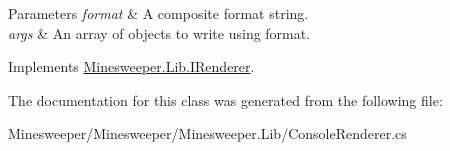 \begin{DoxyParams}{Parameters}
{\em format} & A composite format string.\\
\hline
{\em args} & An array of objects to write using format.\\
\hline
\end{DoxyParams}


Implements \hyperlink{interface_minesweeper_1_1_lib_1_1_i_renderer_a70b1435fe82e94c6b97367b374b70d05}{Minesweeper.\+Lib.\+I\+Renderer}.



The documentation for this class was generated from the following file\+:\begin{DoxyCompactItemize}
\item 
Minesweeper/\+Minesweeper/\+Minesweeper.\+Lib/Console\+Renderer.\+cs\end{DoxyCompactItemize}
